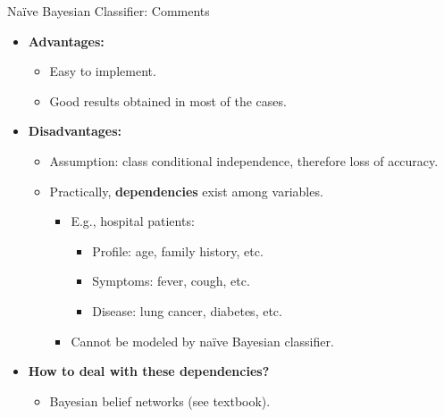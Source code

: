 \begin{frame}{Naïve Bayesian Classifier: Comments}
	\begin{itemize}
		\item \textbf{Advantages:}
		      \begin{itemize}
			      \item Easy to implement.
			      \item Good results obtained in most of the cases.
		      \end{itemize}
		\item \textbf{Disadvantages:}
		      \begin{itemize}
			      \item Assumption: class conditional independence, therefore loss of accuracy.
			      \item Practically, \textbf{dependencies} exist among variables.
			            \begin{itemize}
				            \item E.g., hospital patients:
				                  \begin{itemize}
					                  \item Profile: age, family history, etc.
					                  \item Symptoms: fever, cough, etc.
					                  \item Disease: lung cancer, diabetes, etc.
				                  \end{itemize}
				            \item Cannot be modeled by naïve Bayesian classifier.
			            \end{itemize}
		      \end{itemize}
		\item \textbf{How to deal with these dependencies?}
		      \begin{itemize}
			      \item Bayesian belief networks (see textbook).
		      \end{itemize}
	\end{itemize}
\end{frame}
